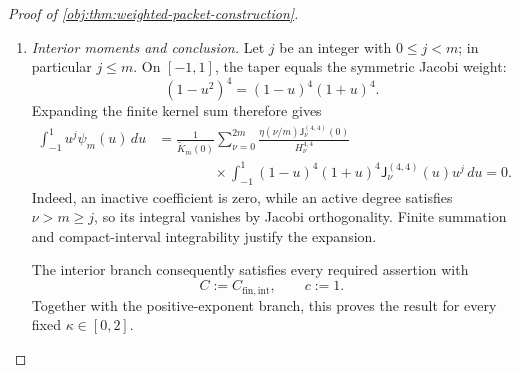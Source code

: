 \begin{proof}[Proof of \cref{obj:thm:weighted-packet-construction}]
\begin{enumerate}
\item \emph{Interior moments and conclusion.}
Let \(j\) be an integer with \(0\le j<m\); in particular \(j\le m\). On \([-1,1]\), the taper equals the symmetric Jacobi weight:
\[
(1-u^2)^4=(1-u)^4(1+u)^4.
\]
Expanding the finite kernel sum therefore gives
\[
\begin{split}
\int_{-1}^1u^j\psi_m(u)\,du
&=
\frac1{\widetilde K_m(0)}
\sum_{\nu=0}^{2m}
\frac{\eta(\nu/m)\mathsf J_\nu^{(4,4)}(0)}
     {H_\nu^{4,4}}\\
&\qquad\qquad{}\times
\int_{-1}^1
(1-u)^4(1+u)^4
\mathsf J_\nu^{(4,4)}(u)u^j\,du
=0.
\end{split}
\]
Indeed, an inactive coefficient is zero, while an active degree satisfies
\(\nu>m\ge j\), so its integral vanishes by Jacobi orthogonality. Finite summation and compact-interval integrability justify the expansion.

The interior branch consequently satisfies every required assertion with
\[
C:=C_{\mathrm{fin,int}},
\qquad c:=1.
\]
Together with the positive-exponent branch, this proves the result for every fixed \(\kappa\in[0,2]\).
\end{enumerate}
\end{proof}

